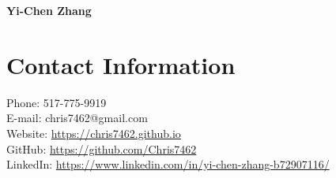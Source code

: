 \documentclass[a4paper,10pt,dvipdfmx]{article}
\begin{document}
\begin{center}
  {\huge \textbf{Yi-Chen Zhang}}
\end{center}

\section*{Contact Information}
\indent Phone: 517-775-9919\\
\indent E-mail: chris7462@gmail.com\\
\indent Website: \href{https://chris7462.github.io}{https://chris7462.github.io}\\
\indent GitHub: \href{https://github.com/Chris7462}{https://github.com/Chris7462}\\
\indent LinkedIn: \href{https://www.linkedin.com/in/yi-chen-zhang-b72907116/}{https://www.linkedin.com/in/yi-chen-zhang-b72907116/}
\end{document}
